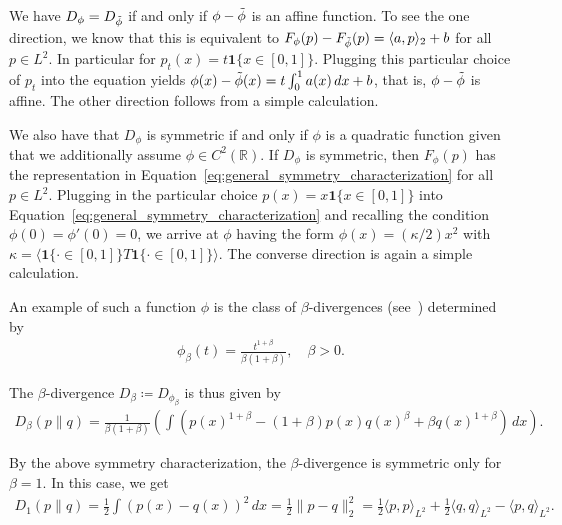 We have $D_{\phi}=D_{\Tilde{\phi}}$ if and only if $\phi-\Tilde{\phi}$ is an affine function. To see the one direction, we know that this is equivalent to $F_{\phi}(p)-F_{\Tilde{\phi}}(p)=\langle a,p\rangle_2+b$ for all $p\in L^2$. In particular for $p_t(x)=t\mathbf{1}\{x\in[0,1]\}$. Plugging this particular choice of $p_t$ into the equation yields $\phi(x)-\Tilde{\phi}(x)=t\int_0^1a(x)\,dx+b$, that is, $\phi-\Tilde{\phi}$ is affine. The other direction follows from a simple calculation.

We also have that $D_{\phi}$ is symmetric if and only if $\phi$ is a quadratic function given that we additionally assume $\phi\in C^2(\mathbb{R})$. If $D_{\phi}$ is symmetric, then $F_{\phi}(p)$ has the representation in Equation~\eqref{eq:general_symmetry_characterization} for all $p\in L^2$. Plugging in the particular choice $p(x)=x\mathbf{1}\{x\in[0,1]\}$ into Equation~\eqref{eq:general_symmetry_characterization} and recalling the condition $\phi(0)=\phi'(0)=0$, we arrive at $\phi$ having the form $\phi(x)=(\kappa/2)x^2$ with $\kappa=\langle\mathbf{1}\{\cdot\in[0,1]\}T\mathbf{1}\{\cdot\in[0,1]\}\rangle$. The converse direction is again a simple calculation.


An example of such a function $\phi$ is the class of $\beta$-divergences (see~\cite[Equation~(46)]{cichocki_families_2010}) determined by
\begin{align*}
    \phi_{\beta}(t)=\frac{t^{1+\beta}}{\beta(1+\beta)},\quad\beta>0.
\end{align*}

The $\beta$-divergence $D_{\beta}\coloneqq D_{\phi_{\beta}}$ is thus given by
\begin{align*}
    D_{\beta}(p\|q)=\frac{1}{\beta(1+\beta)}\left(\int\left(p(x)^{1+\beta}-(1+\beta)p(x)q(x)^{\beta}+\beta q(x)^{1+\beta}\right)\,dx\right).
\end{align*}

By the above symmetry characterization, the $\beta$-divergence is symmetric only for $\beta=1$. In this case, we get
\begin{align*}
    D_1(p\|q)=\frac{1}{2}\int(p(x)-q(x))^2\,dx=\frac{1}{2}\|p-q\|_2^2=\frac{1}{2}\langle p,p\rangle_{L^2}+\frac{1}{2}\langle q,q\rangle_{L^2}-\langle p,q\rangle_{L^2}.
\end{align*}


